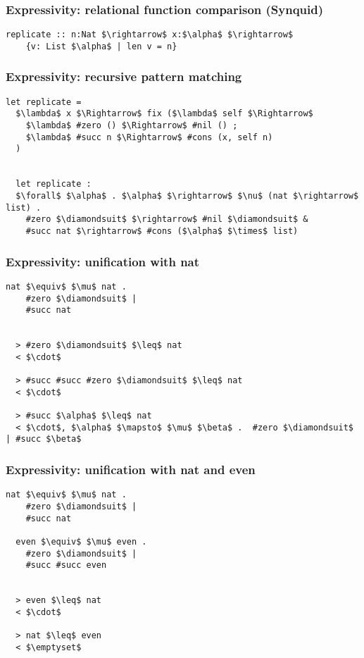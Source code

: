 \documentclass{beamer}
\begin{document}
\begin{frame}[fragile]

  \frametitle{Expressivity: relational function comparison (Synquid)}

  \begin{lstlisting}[keywords={termination, measure, data, where}]
  replicate :: n:Nat $\rightarrow$ x:$\alpha$ $\rightarrow$ 
    {v: List $\alpha$ | len v = n}

  \end{lstlisting}

  \hfill
\end{frame}

\begin{frame}[fragile]
  \frametitle{Expressivity: recursive pattern matching}
  \begin{lstlisting}[]
  let replicate = 
  $\lambda$ x $\Rightarrow$ fix ($\lambda$ self $\Rightarrow$
    $\lambda$ #zero () $\Rightarrow$ #nil () ;
    $\lambda$ #succ n $\Rightarrow$ #cons (x, self n)
  )


  let replicate : 
  $\forall$ $\alpha$ . $\alpha$ $\rightarrow$ $\nu$ (nat $\rightarrow$ list) .
    #zero $\diamondsuit$ $\rightarrow$ #nil $\diamondsuit$ & 
    #succ nat $\rightarrow$ #cons ($\alpha$ $\times$ list)
  \end{lstlisting}
\end{frame}


\begin{frame}[fragile]
  \frametitle{Expressivity: unification with nat}

  \begin{lstlisting}[]
  nat $\equiv$ $\mu$ nat .
    #zero $\diamondsuit$ | 
    #succ nat


  > #zero $\diamondsuit$ $\leq$ nat 
  < $\cdot$

  > #succ #succ #zero $\diamondsuit$ $\leq$ nat 
  < $\cdot$

  > #succ $\alpha$ $\leq$ nat 
  < $\cdot$, $\alpha$ $\mapsto$ $\mu$ $\beta$ .  #zero $\diamondsuit$ | #succ $\beta$
  \end{lstlisting} 

\end{frame}

\begin{frame}[fragile]
  \frametitle{Expressivity: unification with nat and even}

  \begin{lstlisting}[]
  nat $\equiv$ $\mu$ nat .
    #zero $\diamondsuit$ | 
    #succ nat

  even $\equiv$ $\mu$ even .
    #zero $\diamondsuit$ | 
    #succ #succ even 


  > even $\leq$ nat 
  < $\cdot$

  > nat $\leq$ even 
  < $\emptyset$
  \end{lstlisting} 

\end{frame}
\end{document}
